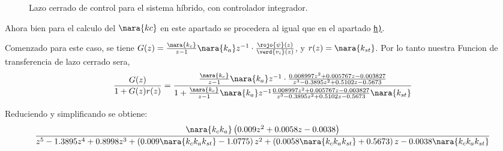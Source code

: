\begin{figure}[h]
  \caption{Lazo cerrado de control para el sistema híbrido, con controlador integrador.}\label{fig:control-prop-hibrido}
\end{figure}



Ahora bien para el calculo del $\nara{kc}$ en este apartado se procedera al igual que en el apartado \hyperref[pregunta-h]{\texttt{h)}}.

Comenzado para este caso, se tiene $G(z) = \frac{\nara{k_{c}}}{z-1}\nara{k_{a}} z^{-1} \cdot \frac{\rojo{\psi}(z)}{\verd{v_i}(z)}$,
y $r(z) = \nara{k_{st}}$.  Por lo tanto nuestra Funcion de transferencia de lazo cerrado sera,
\begin{equation}
    \frac{G(z)}{1 + G(z)r(z)} = \dfrac{\frac{\nara{k_{c}}}{z-1}\nara{k_a} z^{-1} \cdot\frac{0.008997z^2 + 0.005767 z - 0.003827}
    {z^3 - 0.3895 z^2 + 0.5102 z -0.5673}}
    {1+\frac{\nara{k_{c}}}{z-1}\nara{k_a} z^{-1} \frac{0.008997z^2 + 0.005767 z - 0.003827}
    {z^3 - 0.3895 z^2 + 0.5102 z -0.5673}\nara{k_{st}}}
\end{equation}

Reduciendo y simplificando se obtiene:
\begin{equation}\label{eq:fdt-LCdi}
    \frac{ \nara{k_c k_a} \left( 0.009 z^2 + 0.0058 z - 0.0038 \right)}
    { z^5 -1.3895z^4 + 0.8998z^3 + \left( 0.009\nara{k_c k_a k_{st}}  -1.0775 \right) z^2 
    + \left(0.0058 \nara{k_c k_a k_{st}}   + 0.5673 \right) z 
    -0.0038 \nara{k_c k_a k_{st}} }
\end{equation}

